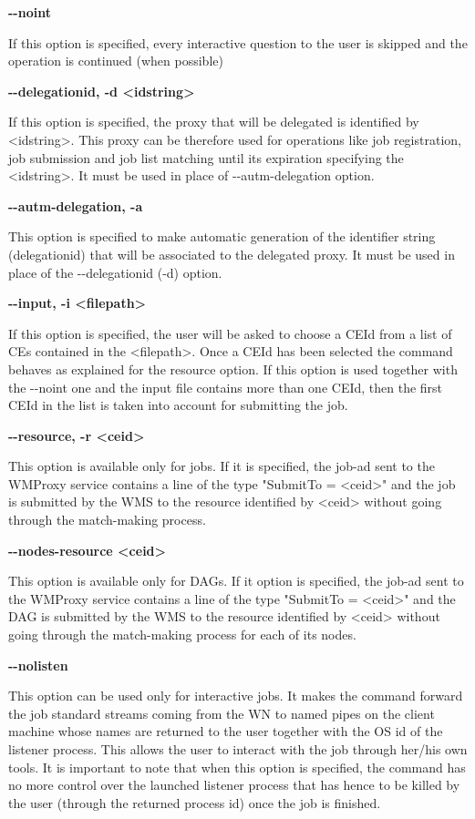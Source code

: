 \textbf{-{}-noint}

If this option is specified, every interactive question to the user is skipped and the operation is continued (when possible)




\textbf{-{}-delegationid, -d <idstring>}

If this option is specified, the proxy that will be delegated is identified by <idstring>. This proxy can be therefore used for operations like job registration, job submission and job list matching until its expiration specifying the <idstring>. It must be used in place of -{}-autm-delegation option.




\textbf{-{}-autm-delegation, -a}

This option is specified to make automatic generation of the identifier string (delegationid) that will be associated to the delegated proxy. It must be used in place of the -{}-delegationid (-d) option.




\textbf{-{}-input, -i <filepath>}

If this option is specified, the user will be asked to choose a CEId from a list of CEs contained in the <filepath>. Once a CEId has been selected the command behaves as explained for the resource option. If this option is used together with the -{}-noint one and the input file contains more than one CEId, then the first CEId in the list is taken into account for submitting the job.




\textbf{-{}-resource, -r <ceid>}

This option is available only for jobs.
If it is specified, the job-ad sent to the WMProxy service contains a line of the type "SubmitTo = <ceid>"  and the job is submitted by the WMS to the resource identified by <ceid> without going through the match-making process.




\textbf{-{}-nodes-resource <ceid>}

This option is available only for DAGs.
If it option is specified, the job-ad sent to the WMProxy service contains a line of the type "SubmitTo = <ceid>"  and the DAG is submitted by the WMS to the resource identified by <ceid> without going through the match-making process for each of its nodes.




\textbf{-{}-nolisten}

This option can be used only for interactive jobs. It makes the command forward the job standard streams coming from the WN to named pipes on the client machine whose names are returned to the user together with the OS id of the listener process. This allows the user to interact with the job through her/his own tools. It is important to note that when this option is specified, the command has no more control over the launched listener process that has hence to be killed by the user (through the returned process id) once the job is finished.




